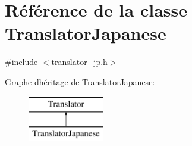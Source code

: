\hypertarget{class_translator_japanese}{}\section{Référence de la classe Translator\+Japanese}
\label{class_translator_japanese}


{\ttfamily \#include $<$translator\+\_\+jp.\+h$>$}

Graphe d\textquotesingle{}héritage de Translator\+Japanese\+:\begin{figure}[H]
\begin{center}
\leavevmode
\includegraphics[height=2.000000cm]{class_translator_japanese}
\end{center}
\end{figure}
